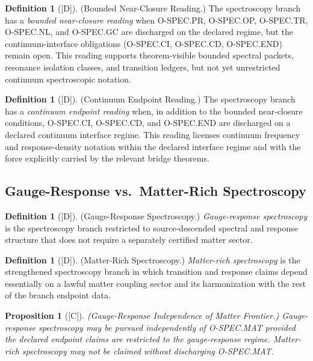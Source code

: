 \documentclass[12pt,oneside]{amsbook}
\theoremstyle{plain}
\newtheorem{proposition}[theorem]{Proposition}
\theoremstyle{definition}
\newtheorem{definition}[theorem]{Definition}
\theoremstyle{remark}
\newcommand{\status}[1]{\textup{[#1]}}
\begin{document}
\begin{definition}[\status{D}]\label{def:bounded-near-closure}
\textup{(Bounded Near-Closure Reading.)}
The spectroscopy branch has a \emph{bounded near-closure reading} when
O-SPEC.PR, O-SPEC.OP, O-SPEC.TR, O-SPEC.NL, and O-SPEC.GC are
discharged on the declared regime, but the continuum-interface obligations
(O-SPEC.CI, O-SPEC.CD, O-SPEC.END) remain open. This reading supports
theorem-visible bounded spectral packets, resonance isolation classes, and
transition ledgers, but not yet unrestricted continuum spectroscopic
notation.
\end{definition}

\begin{definition}[\status{D}]\label{def:continuum-endpoint-reading}
\textup{(Continuum Endpoint Reading.)}
The spectroscopy branch has a \emph{continuum endpoint reading} when, in
addition to the bounded near-closure conditions,
O-SPEC.CI, O-SPEC.CD, and O-SPEC.END are discharged on a declared
continuum interface regime. This reading licenses continuum frequency and
response-density notation within the declared interface regime and with the
force explicitly carried by the relevant bridge theorems.
\end{definition}

\subsection{Gauge-Response vs.\ Matter-Rich Spectroscopy}\label{sec:spec-gr-vs-mat}

\begin{definition}[\status{D}]\label{def:gauge-response-spectroscopy}
\textup{(Gauge-Response Spectroscopy.)}
\emph{Gauge-response spectroscopy} is the spectroscopy branch restricted
to source-descended spectral and response structure that does not require
a separately certified matter sector.
\end{definition}

\begin{definition}[\status{D}]\label{def:matter-rich-spectroscopy}
\textup{(Matter-Rich Spectroscopy.)}
\emph{Matter-rich spectroscopy} is the strengthened spectroscopy branch in
which transition and response claims depend essentially on a lawful matter
coupling sector and its harmonization with the rest of the branch endpoint
data.
\end{definition}

\begin{proposition}[\status{C}]\label{prop:gauge-vs-matter-independence}
\textup{(Gauge-Response Independence of Matter Frontier.)}
Gauge-response spectroscopy may be pursued independently of O-SPEC.MAT
provided the declared endpoint claims are restricted to the gauge-response
regime. Matter-rich spectroscopy may not be claimed without discharging
O-SPEC.MAT.
\end{proposition}
\end{document}
